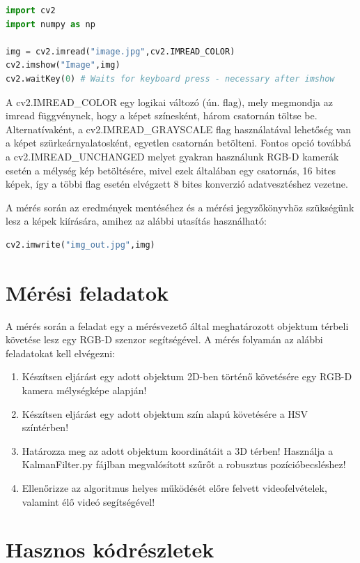 \documentclass[12pt,a4paper,oneside]{report}             %
\begin{document}
\begin{lstlisting}[language=Python]
import cv2
import numpy as np

img = cv2.imread("image.jpg",cv2.IMREAD_COLOR)
cv2.imshow("Image",img)
cv2.waitKey(0) # Waits for keyboard press - necessary after imshow
\end{lstlisting}

A cv2.IMREAD\_COLOR egy logikai változó (ún. flag), mely megmondja az imread függvénynek, hogy a képet színesként, három csatornán töltse be.  Alternatívaként, a cv2.IMREAD\_GRAYSCALE flag használatával lehetőség van a képet szürkeárnyalatosként, egyetlen csatornán betölteni. Fontos opció továbbá a cv2.IMREAD\_UNCHANGED melyet gyakran használunk RGB-D kamerák esetén a mélység kép betöltésére, mivel ezek általában egy csatornás, 16 bites képek, így a többi flag esetén elvégzett 8 bites konverzió adatvesztéshez vezetne.

A mérés során az eredmények mentéséhez és a mérési jegyzőkönyvhöz szükségünk lesz a képek kiírására, amihez az alábbi utasítás használható:

\begin{lstlisting}[language=Python]
cv2.imwrite("img_out.jpg",img)
\end{lstlisting}

\chapter{Mérési feladatok}

A mérés során a feladat egy a mérésvezető által meghatározott objektum térbeli követése lesz egy RGB-D szenzor segítségével. A mérés folyamán az alábbi feladatokat kell elvégezni:

\begin{enumerate}
\item Készítsen eljárást egy adott objektum 2D-ben történő követésére egy RGB-D kamera mélységképe alapján!
\item Készítsen eljárást egy adott objektum szín alapú követésére a HSV színtérben!
\item Határozza meg az adott objektum koordinátáit a 3D térben! Használja a KalmanFilter.py fájlban megvalósított szűrőt a robusztus pozícióbecsléshez!
\item Ellenőrizze az algoritmus helyes működését előre felvett videofelvételek, valamint élő videó segítségével!
\end{enumerate}

\chapter{Hasznos kódrészletek}
\end{document}
